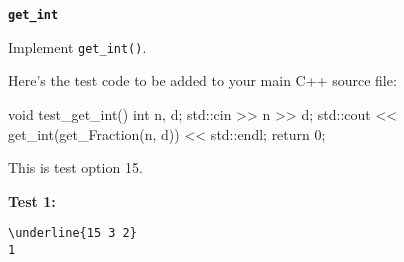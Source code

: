 \textbf{\texttt{get\_int}}

Implement \verb!get_int()!.

Here's the test code to be added to your main C++ source file:
\begin{console}
void test_get_int()
{
    int n, d;
    std::cin >> n >> d;
    std::cout << get_int(get_Fraction(n, d)) << std::endl;
    return 0;
}
\end{console}
This is test option 15.

\textbf{Test 1:}
\begin{Verbatim}[frame=single, commandchars=\\\{\}]
\underline{15 3 2}
1
\end{Verbatim}
